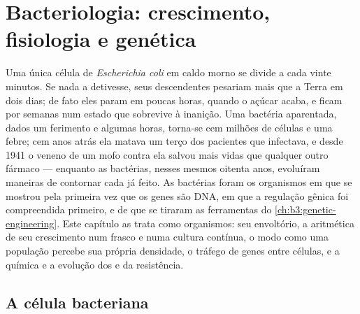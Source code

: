 \chapter{Bacteriologia: crescimento, fisiologia e genética}\label{ch:b3:bacteriology}

Uma única célula de \emph{Escherichia coli} em caldo morno se divide a
cada vinte minutos. Se nada a detivesse, seus descendentes pesariam
mais que a Terra em dois dias; de fato eles param em poucas horas,
quando o açúcar acaba, e ficam por semanas num estado que sobrevive à
inanição. Uma bactéria aparentada, dados um ferimento e algumas horas,
torna-se cem milhões de células e uma febre; cem anos atrás ela matava
um terço dos pacientes que infectava, e desde 1941 o veneno de um mofo
contra ela salvou mais vidas que qualquer outro fármaco --- enquanto as
bactérias, nesses mesmos oitenta anos, evoluíram maneiras de contornar
cada  já feito. As bactérias foram os organismos em que se
mostrou pela primeira vez que os genes são DNA, em que a regulação
gênica foi compreendida primeiro, e de que se tiraram as ferramentas do
\cref{ch:b3:genetic-engineering}. Este capítulo as trata como
organismos: seu envoltório, a aritmética de seu crescimento num frasco
e numa cultura contínua, o modo como uma população percebe sua própria
densidade, o tráfego de genes entre células, e a química e a evolução
dos  e da resistência.

\section{A célula bacteriana}

